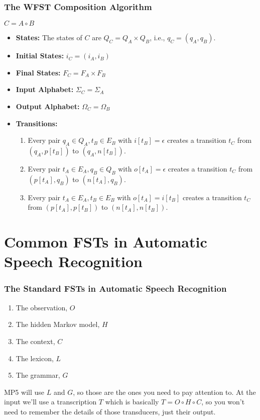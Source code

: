 \documentclass{beamer}
\begin{document}
\begin{frame}
  \frametitle{The WFST Composition Algorithm}
  \centerline{$C = A\circ B$}
  \begin{itemize}
  \item {\bf States:} The states of $C$ are $Q_C=Q_A\times Q_B$,
    i.e., $q_C=(q_A,q_B)$.
  \item {\bf Initial States:} $i_C=(i_A,i_B)$
  \item {\bf Final States:} $F_C=F_A\times F_B$
  \item {\bf Input Alphabet:} $\Sigma_C=\Sigma_A$
  \item {\bf Output Alphabet:} $\Omega_C=\Omega_B$
  \item {\bf Transitions:}
    \begin{enumerate}
    \item Every pair $q_A\in Q_A,t_B\in E_B$ with $i[t_B]=\epsilon$
      creates a transition $t_C$ from $(q_A,p[t_B])$ to
      $(q_A,n[t_B])$.
    \item Every pair $t_A\in E_A,q_B\in Q_B$ with $o[t_A]=\epsilon$
      creates a transition $t_C$ from $(p[t_A],q_B)$ to $(n[t_A],q_B)$.
    \item Every pair $t_A\in E_A,t_B\in E_B$ with $o[t_A]=i[t_B]$ 
      creates a transition $t_C$ from $(p[t_A],p[t_B])$ to
      $(n[t_A],n[t_B])$.
    \end{enumerate}
  \end{itemize}
\end{frame}


\section[Common FSTs]{Common FSTs in Automatic Speech Recognition}
\setcounter{subsection}{1}

\begin{frame}
  \frametitle{The Standard FSTs in Automatic Speech Recognition}
  \begin{enumerate}
  \item The observation, $O$
  \item The hidden Markov model, $H$
  \item The context, $C$
  \item The lexicon, $L$
  \item The grammar, $G$
  \end{enumerate}
  MP5 will use $L$ and $G$, so those are the ones you need to pay
  attention to.  At the input we'll use a transcription $T$ which is
  basically $T=O\circ H\circ C$, so you won't need to remember the
  details of those transducers, just their output.
\end{frame}
\end{document}

